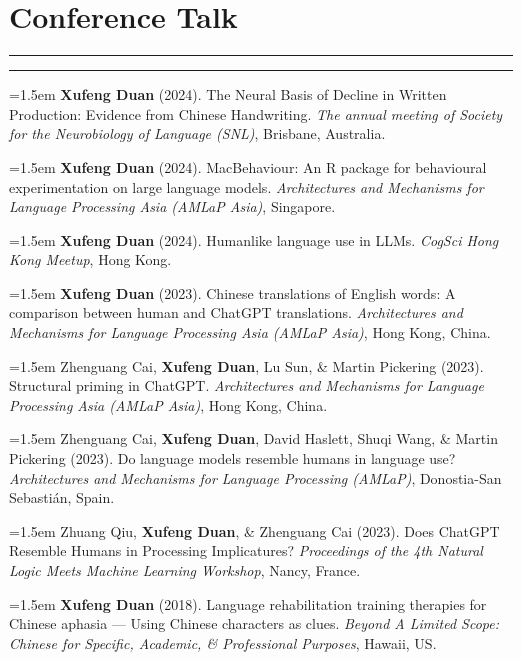 \documentclass[11pt,a4paper]{article}
\begin{document}
\vspace{-1.5em} 
\section*{Conference Talk}
\vspace{-.5em}
\hrule
\vspace{0.3ex} 
\hrule

\hangindent=1.5em  \textbf{Xufeng Duan} (2024). The Neural Basis of Decline in Written Production: Evidence from Chinese Handwriting. \textit{The annual meeting of Society for the Neurobiology of Language (SNL)}, Brisbane, Australia.

\hangindent=1.5em  \textbf{Xufeng Duan} (2024). MacBehaviour: An R package for behavioural experimentation on large language models. \textit{Architectures and Mechanisms for Language Processing Asia (AMLaP Asia)}, Singapore.

\hangindent=1.5em  \textbf{Xufeng Duan} (2024). Humanlike language use in LLMs. \textit{CogSci Hong Kong Meetup}, Hong Kong.

\hangindent=1.5em  \textbf{Xufeng Duan} (2023). Chinese translations of English words: A comparison between human and ChatGPT translations. \textit{Architectures and Mechanisms for Language Processing Asia (AMLaP Asia)}, Hong Kong, China.

\hangindent=1.5em  Zhenguang Cai, \textbf{Xufeng Duan}, Lu Sun, \& Martin Pickering (2023). Structural priming in ChatGPT. \textit{Architectures and Mechanisms for Language Processing Asia (AMLaP Asia)}, Hong Kong, China.

\hangindent=1.5em  Zhenguang Cai, \textbf{Xufeng Duan}, David Haslett, Shuqi Wang, \& Martin Pickering (2023). Do language models resemble humans in language use? \textit{Architectures and Mechanisms for Language Processing (AMLaP)}, Donostia-San Sebastián, Spain.

\hangindent=1.5em  Zhuang Qiu, \textbf{Xufeng Duan}, \& Zhenguang Cai (2023). Does ChatGPT Resemble Humans in Processing Implicatures? \textit{Proceedings of the 4th Natural Logic Meets Machine Learning Workshop}, Nancy, France.

\hangindent=1.5em  \textbf{Xufeng Duan} (2018). Language rehabilitation training therapies for Chinese aphasia — Using Chinese characters as clues. \textit{Beyond A Limited Scope: Chinese for Specific, Academic, \& Professional Purposes}, Hawaii, US.
\end{document}
